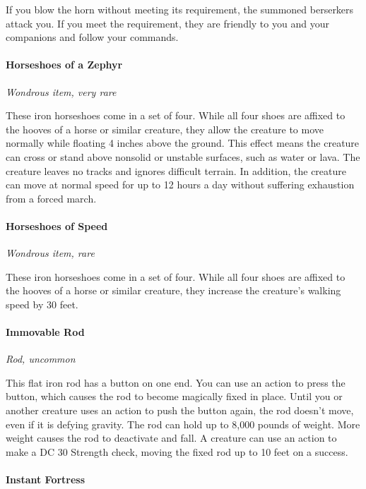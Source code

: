 \documentclass[
]{article}
\begin{document}
If you blow the horn without meeting its requirement, the summoned
berserkers attack you. If you meet the requirement, they are friendly to
you and your companions and follow your commands.

\hypertarget{horseshoes-of-a-zephyr}{%
\paragraph{Horseshoes of a Zephyr}\label{horseshoes-of-a-zephyr}}

\emph{Wondrous item, very rare}

These iron horseshoes come in a set of four. While all four shoes are
affixed to the hooves of a horse or similar creature, they allow the
creature to move normally while floating 4 inches above the ground. This
effect means the creature can cross or stand above nonsolid or unstable
surfaces, such as water or lava. The creature leaves no tracks and
ignores difficult terrain. In addition, the creature can move at normal
speed for up to 12 hours a day without suffering exhaustion from a
forced march.

\hypertarget{horseshoes-of-speed}{%
\paragraph{Horseshoes of Speed}\label{horseshoes-of-speed}}

\emph{Wondrous item, rare}

These iron horseshoes come in a set of four. While all four shoes are
affixed to the hooves of a horse or similar creature, they increase the
creature's walking speed by 30 feet.

\hypertarget{immovable-rod}{%
\paragraph{Immovable Rod}\label{immovable-rod}}

\emph{Rod, uncommon}

This flat iron rod has a button on one end. You can use an action to
press the button, which causes the rod to become magically fixed in
place. Until you or another creature uses an action to push the button
again, the rod doesn't move, even if it is defying gravity. The rod can
hold up to 8,000 pounds of weight. More weight causes the rod to
deactivate and fall. A creature can use an action to make a DC 30
Strength check, moving the fixed rod up to 10 feet on a success.

\hypertarget{instant-fortress}{%
\paragraph{Instant Fortress}\label{instant-fortress}}
\end{document}
